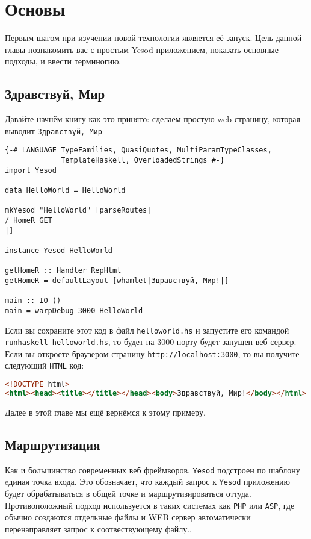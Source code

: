 \chapter{Основы}\label{ch:basics}

Первым шагом при изучении новой технологии является её запуск. Цель данной главы 
познакомить вас с простым Yesod приложением, показать основные подходы, и ввести
терминогию.

\section{Здравствуй, Мир}

Давайте начнём книгу как это принято: сделаем простую web страницу, которая выводит
\texttt{Здравствуй, Мир}

\begin{lstlisting}
{-# LANGUAGE TypeFamilies, QuasiQuotes, MultiParamTypeClasses,
             TemplateHaskell, OverloadedStrings #-}
import Yesod

data HelloWorld = HelloWorld

mkYesod "HelloWorld" [parseRoutes|
/ HomeR GET
|]

instance Yesod HelloWorld

getHomeR :: Handler RepHtml
getHomeR = defaultLayout [whamlet|Здравствуй, Мир!|]

main :: IO ()
main = warpDebug 3000 HelloWorld
\end{lstlisting}

Если вы сохраните этот код в файл \lstinline!helloworld.hs! и запустите его командой
\lstinline!runhaskell helloworld.hs!, то будет на 3000 порту будет запущен веб сервер. 
Если вы откроете браузером страницу \lstinline'http://localhost:3000',
то вы получите следующий \texttt{HTML} код:

\begin{lstlisting}[language=HTML]
<!DOCTYPE html>
<html><head><title></title></head><body>Здравствуй, Мир!</body></html>
\end{lstlisting}

Далее в этой главе мы ещё вернёмся к этому примеру.

\section{Маршрутизация}

Как и большинство современных веб фреймворов, \texttt{Yesod} подстроен по шаблону eдиная
точка входа. Это обозначает, что каждый запрос к \texttt{Yesod} приложению будет 
обрабатываться в общей точке и маршрутизироваться оттуда. Противоположный
подход используется в таких системах как \texttt{PHP} или \texttt{ASP}, 
где обычно создаются отдельные файлы и WEB сервер автоматически перенаправляет 
запрос к соотвествующему файлу..

